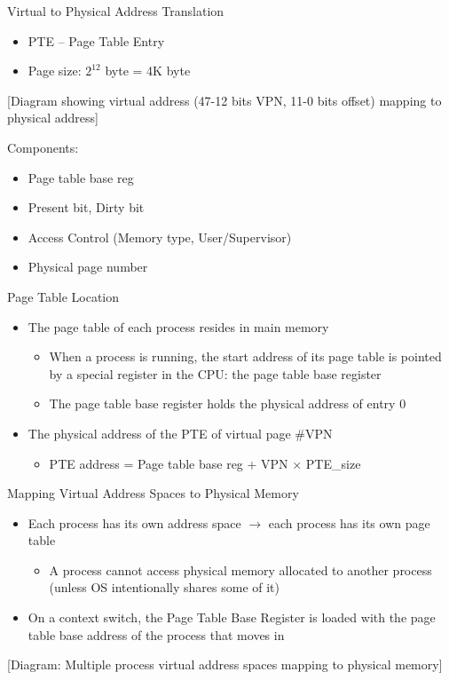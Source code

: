 \documentclass[aspectratio=169,12pt]{beamer}
\begin{document}
\begin{frame}{Virtual to Physical Address Translation}
\begin{itemize}
\item PTE – Page Table Entry
\item Page size: $2^{12}$ byte = 4K byte
\end{itemize}
\begin{center}
[Diagram showing virtual address (47-12 bits VPN, 11-0 bits offset) mapping to physical address]
\end{center}
Components:
\begin{itemize}
\item Page table base reg
\item Present bit, Dirty bit
\item Access Control (Memory type, User/Supervisor)
\item Physical page number
\end{itemize}
\end{frame}

\begin{frame}{Page Table Location}
\begin{itemize}
\item The page table of each process resides in main memory
    \begin{itemize}
    \item When a process is running, the start address of its page table is pointed by a special register in the CPU: the page table base register
    \item The page table base register holds the physical address of entry 0
    \end{itemize}
\item The physical address of the PTE of virtual page \#VPN
    \begin{itemize}
    \item PTE address = Page table base reg + VPN $\times$ PTE\_size
    \end{itemize}
\end{itemize}
\end{frame}

\begin{frame}{Mapping Virtual Address Spaces to Physical Memory}
\begin{itemize}
\item Each process has its own address space $\rightarrow$ each process has its own page table
    \begin{itemize}
    \item A process cannot access physical memory allocated to another process (unless OS intentionally shares some of it)
    \end{itemize}
\item On a context switch, the Page Table Base Register is loaded with the page table base address of the process that moves in
\end{itemize}
\begin{center}
[Diagram: Multiple process virtual address spaces mapping to physical memory]
\end{center}
\end{frame}
\end{document}
